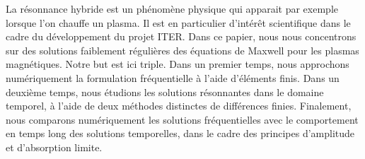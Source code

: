 La r\'esonnance hybride est un ph\'enom\`ene physique qui apparait par exemple lorsque l'on chauffe un plasma.
Il est en particulier d'int\'er\^et scientifique dans le cadre du d\'eveloppement  du projet ITER. Dans ce papier, nous nous concentrons sur des solutions faiblement r\'eguli\`eres des \'equations de Maxwell pour les plasmas magn\'etiques. Notre but est ici triple. Dans un premier temps, nous 
approchons num\'eriquement la formulation fr\'equentielle \`a l'aide d'\'el\'ements finis. Dans un deuxi\`eme temps, nous \'etudions les solutions r\'esonnantes dans le domaine temporel, \`a l'aide de deux m\'ethodes distinctes de diff\'erences finies. Finalement, nous comparons  num\'eriquement les solutions fr\'equentielles avec le comportement en temps long des solutions temporelles, dans le cadre
des principes d'amplitude et d'absorption limite.

